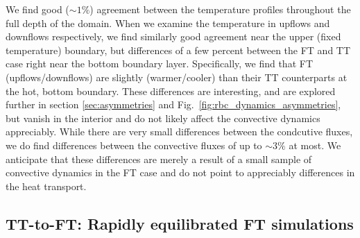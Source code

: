 \documentclass[aps, pre, onecolumn, nofootinbib, notitlepage, groupedaddress, amsfonts, amssymb, amsmath, longbibliography, superscriptaddress]{revtex4-1}
\begin{document}
We find good ($\sim 1\%$) agreement between the temperature profiles throughout the full depth of the domain.
When we examine the temperature in upflows and downflows respectively, we find similarly good agreement near the upper (fixed temperature) boundary, but differences of a few percent between the FT and TT case right near the bottom boundary layer.
Specifically, we find that FT (upflows/downflows) are slightly (warmer/cooler) than their TT counterparts at the hot, bottom boundary.
These differences are interesting, and are explored further in section \ref{sec:asymmetries} and Fig.~\ref{fig:rbc_dynamics_asymmetries}, but vanish in the interior and do not likely affect the convective dynamics appreciably.
While there are very small differences between the condcutive fluxes, we do find differences between the convective fluxes of up to $\sim 3\%$ at most.
We anticipate that these differences are merely a result of a small sample of convective dynamics in the FT case and do not point to appreciably differences in the heat transport.

\subsection{TT-to-FT: Rapidly equilibrated FT simulations}
\end{document}
